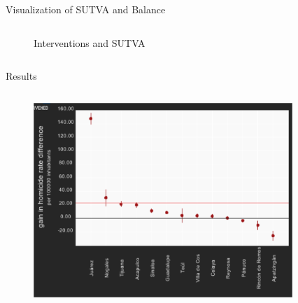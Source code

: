 \documentclass[final]{beamer}
\newlength{\onecolwid}
\newlength{\twocolwid}
\begin{document}
\begin{frame}[t]
\begin{columns}[t]
\begin{column}{\twocolwid}
\begin{block}{ Visualization of SUTVA and Balance}
\begin{columns}[t,totalwidth=\twocolwid]
\begin{column}{\onecolwid}
\begin{figure}[htdp]
	              \caption*{Interventions and SUTVA}
            \end{figure}
          \end{column}
		\end{columns}
	\end{block}
	\begin{block}{Results}
		\begin{columns}[t,totalwidth=\twocolwid]
	          \begin{column}{\onecolwid}
	            \begin{figure}[htdp]
	              \includegraphics[scale=1.3]{../Images/results.png}
	            \end{figure}
	        \end{column}
\begin{column}{\onecolwid}
	            \begin{figure}[htdp]
	              {\raggedright
	              \begin{minipage}[ht]{0.58\linewidth}
\end{minipage}}
\end{figure}
\end{column}
\end{columns}
\end{block}
\end{column}
\end{columns}
\end{frame}
\end{document}
